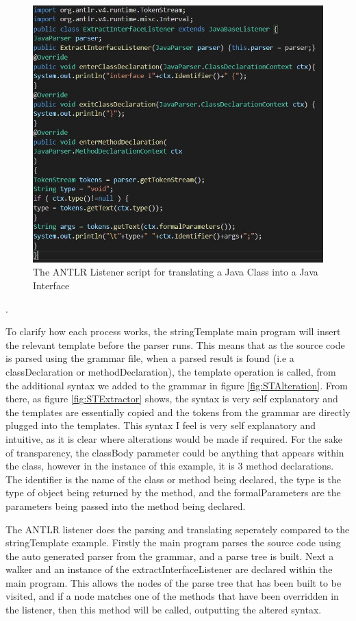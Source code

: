 \documentclass{l4proj}
\begin{document}
\begin{figure}[htb]
    \centering
    \includegraphics[width=1\linewidth]{images/ListenerExtractor.JPG}
        \caption{The ANTLR Listener script for translating a Java Class into a Java Interface
    }
    \label{fig:ListenerExtractor} 
\end{figure}.

To clarify how each process works, the stringTemplate main program will insert the relevant template before the parser runs. This means that as the source code is parsed using the grammar file, when a parsed result is found (i.e a classDeclaration or methodDeclaration), the template operation is called, from the additional syntax we added to the grammar in figure \ref{fig:STAlteration}. From there, as figure \ref{fig:STExtractor} shows, the syntax is very self explanatory and the templates are essentially copied and the tokens from the grammar are directly plugged into the templates. This syntax I feel is very self explanatory and intuitive, as it is clear where alterations would be made if required. For the sake of transparency, the classBody parameter could be anything that appears within the class, however in the instance of this example, it is 3 method declarations. The identifier is the name of the class or method being declared, the type is the type of object being returned by the method, and the formalParameters are the parameters being passed into the method being declared.

The ANTLR listener does the parsing and translating seperately compared to the stringTemplate example. Firstly the main program parses the source code using the auto generated parser from the grammar, and a parse tree is built. Next a walker and an instance of the extractInterfaceListener are declared within the main program. This allows the nodes of the parse tree that has been built to be visited, and if a node matches one of the methods that have been overridden in the listener, then this method will be called, outputting the altered syntax.
\end{document}
